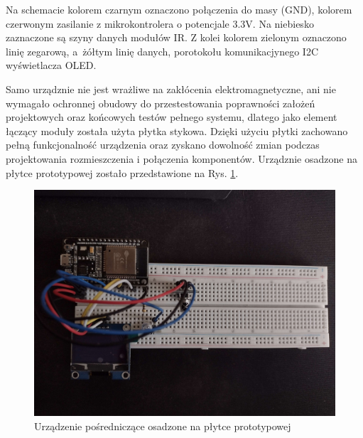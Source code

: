 \documentclass[12pt,twoside]{article}
\begin{document}
Na schemacie kolorem czarnym oznaczono połączenia do masy (GND), kolorem czerwonym zasilanie z mikrokontrolera o potencjale 3.3V. Na niebiesko zaznaczone są szyny danych modułów IR. Z kolei kolorem zielonym oznaczono linię zegarową, a~żółtym linię danych, porotokołu komunikacjynego I2C wyświetlacza OLED.

Samo urządznie nie jest wrażliwe na zakłócenia elektromagnetyczne, ani nie wymagało ochronnej obudowy do przestestowania poprawności założeń projektowych oraz końcowych testów pełnego systemu, dlatego jako element łączący moduły została użyta płytka stykowa. Dzięki użyciu płytki zachowano pełną funkcjonalność urządzenia oraz zyskano dowolność zmian podczas projektowania rozmieszczenia i połączenia komponentów. Urządznie osadzone na płytce prototypowej zostało przedstawione na Rys. \ref*{Fig:deviceOnBoard}.
\begin{figure}[ht]
   \centering
   \includegraphics[width=12cm]{images/deviceOnBoard.jpg}
   \caption{Urządzenie pośredniczące osadzone na płytce prototypowej}
   \label{Fig:deviceOnBoard}
\end{figure}
\end{document}
